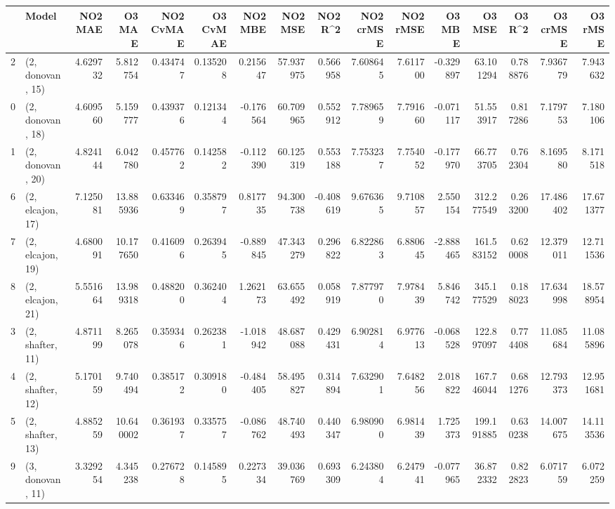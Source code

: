 \begin{tabular}{llrrrrrrrrrrrrrr}
\toprule
{} &             Model &    NO2 MAE &     O3 MAE &  NO2 CvMAE &  O3 CvMAE &   NO2 MBE &     NO2 MSE &   NO2 R\textasciicircum2 &  NO2 crMSE &   NO2 rMSE &     O3 MBE &      O3 MSE &    O3 R\textasciicircum2 &   O3 crMSE &    O3 rMSE \\
\midrule
2  &  (2, donovan, 15) &   4.629732 &   5.812754 &   0.434747 &  0.135208 &  0.215647 &   57.937975 &  0.566958 &   7.608645 &   7.611700 &  -0.329897 &   63.101294 &  0.788876 &   7.936779 &   7.943632 \\
0  &  (2, donovan, 18) &   4.609560 &   5.159777 &   0.439376 &  0.121344 & -0.176564 &   60.709965 &  0.552912 &   7.789659 &   7.791660 &  -0.071117 &   51.553917 &  0.817286 &   7.179753 &   7.180106 \\
1  &  (2, donovan, 20) &   4.824144 &   6.042780 &   0.457762 &  0.142582 & -0.112390 &   60.125319 &  0.553188 &   7.753237 &   7.754052 &  -0.177970 &   66.773705 &  0.762304 &   8.169580 &   8.171518 \\
6  &  (2, elcajon, 17) &   7.125081 &  13.885936 &   0.633469 &  0.358797 &  0.817735 &   94.300738 & -0.408619 &   9.676365 &   9.710857 &   2.550154 &  312.277549 &  0.263200 &  17.486402 &  17.671377 \\
7  &  (2, elcajon, 19) &   4.680091 &  10.177650 &   0.416096 &  0.263945 & -0.889845 &   47.343279 &  0.296822 &   6.822863 &   6.880645 &  -2.888465 &  161.583152 &  0.620008 &  12.379011 &  12.711536 \\
8  &  (2, elcajon, 21) &   5.551664 &  13.989318 &   0.488200 &  0.362404 &  1.262173 &   63.655492 &  0.058919 &   7.877970 &   7.978439 &   5.846742 &  345.177529 &  0.188023 &  17.634998 &  18.578954 \\
3  &  (2, shafter, 11) &   4.871199 &   8.265078 &   0.359346 &  0.262381 & -1.018942 &   48.687088 &  0.429431 &   6.902814 &   6.977613 &  -0.068528 &  122.897097 &  0.774408 &  11.085684 &  11.085896 \\
4  &  (2, shafter, 12) &   5.170159 &   9.740494 &   0.385172 &  0.309180 & -0.484405 &   58.495827 &  0.314894 &   7.632901 &   7.648256 &   2.018822 &  167.746044 &  0.681276 &  12.793373 &  12.951681 \\
5  &  (2, shafter, 13) &   4.885259 &  10.640002 &   0.361937 &  0.335757 & -0.086762 &   48.740493 &  0.440347 &   6.980900 &   6.981439 &   1.725373 &  199.191885 &  0.630238 &  14.007675 &  14.113536 \\
9  &  (3, donovan, 11) &   3.329254 &   4.345238 &   0.276728 &  0.145895 &  0.227334 &   39.036769 &  0.693309 &   6.243804 &   6.247941 &  -0.077965 &   36.872332 &  0.822823 &   6.071759 &   6.072259 \\

\end{tabular}
